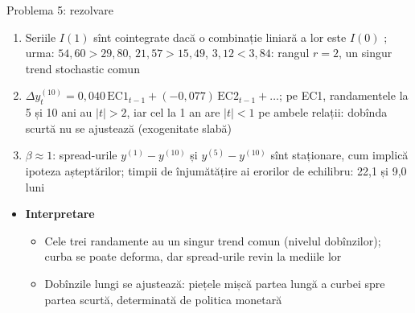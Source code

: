 \begin{frame}{Problema 5: rezolvare}
\itemsize{\footnotesize}
\begin{enumerate}
    \item Seriile $I(1)$ sînt cointegrate dacă o combinație liniară a lor este $I(0)$ ; urma: $54{,}60 > 29{,}80$, $21{,}57 > 15{,}49$, $3{,}12 < 3{,}84$: rangul $r = 2$, un singur trend stochastic comun 
    \item $\Delta y^{(10)}_t = 0{,}040\,\mathrm{EC1}_{t-1} + (\ensuremath{-}0{,}077)\,\mathrm{EC2}_{t-1} + \dots$; pe EC1, randamentele la 5 și 10 ani au $|t| > 2$, iar cel la 1 an are $|t| < 1$ pe ambele relații: dobînda scurtă nu se ajustează (exogenitate slabă)
    \item $\beta \approx 1$: spread-urile $y^{(1)} - y^{(10)}$ și $y^{(5)} - y^{(10)}$ sînt staționare, cum implică ipoteza așteptărilor; timpii de înjumătățire ai erorilor de echilibru: 22{,}1 și 9{,}0 luni
\end{enumerate}
\begin{itemize}
    \item \textbf{Interpretare}
    \begin{itemize}
        \item Cele trei randamente au un singur trend comun (nivelul dobînzilor); curba se poate deforma, dar spread-urile revin la mediile lor
        \item Dobînzile lungi se ajustează: piețele mișcă partea lungă a curbei spre partea scurtă, determinată de politica monetară
    \end{itemize}
\end{itemize}
\end{frame}

